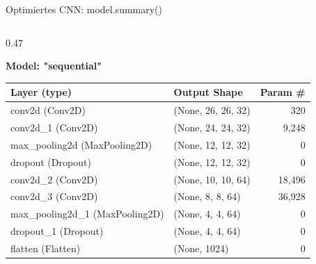 \begin{frame}{Optimiertes CNN: model.summary()}
\begin{columns}
\begin{column}{0.47\linewidth}
{\ttfamily\tiny
{}
\noindent\textbf{Model: "sequential"}
\setlength{\arrayrulewidth}{0.5pt}
\renewcommand{\arraystretch}{1.3}
\begin{tabular}{|l|l|r|}
\hline
\textbf{Layer (type)} & \textbf{Output Shape} & \textbf{Param \#}\\
\hline
conv2d (\textcolor{jupytertype}{Conv2D}) & (\textcolor{jupytertype}{None}, \textcolor{jupyternum}{26}, \textcolor{jupyternum}{26}, \textcolor{jupyternum}{32}) & \textcolor{jupyternum}{320}\\
\hline
conv2d\_1 (\textcolor{jupytertype}{Conv2D}) & (\textcolor{jupytertype}{None}, \textcolor{jupyternum}{24}, \textcolor{jupyternum}{24}, \textcolor{jupyternum}{32}) & \textcolor{jupyternum}{9,248}\\
\hline
max\_pooling2d (\textcolor{jupytertype}{MaxPooling2D}) & (\textcolor{jupytertype}{None}, \textcolor{jupyternum}{12}, \textcolor{jupyternum}{12}, \textcolor{jupyternum}{32}) & \textcolor{jupyternum}{0}\\
\hline
dropout (\textcolor{jupytertype}{Dropout}) & (\textcolor{jupytertype}{None}, \textcolor{jupyternum}{12}, \textcolor{jupyternum}{12}, \textcolor{jupyternum}{32}) & \textcolor{jupyternum}{0}\\
\hline
conv2d\_2 (\textcolor{jupytertype}{Conv2D}) & (\textcolor{jupytertype}{None}, \textcolor{jupyternum}{10}, \textcolor{jupyternum}{10}, \textcolor{jupyternum}{64}) & \textcolor{jupyternum}{18,496}\\
\hline
conv2d\_3 (\textcolor{jupytertype}{Conv2D}) & (\textcolor{jupytertype}{None}, \textcolor{jupyternum}{8}, \textcolor{jupyternum}{8}, \textcolor{jupyternum}{64}) & \textcolor{jupyternum}{36,928}\\
\hline
max\_pooling2d\_1 (\textcolor{jupytertype}{MaxPooling2D}) & (\textcolor{jupytertype}{None}, \textcolor{jupyternum}{4}, \textcolor{jupyternum}{4}, \textcolor{jupyternum}{64}) & \textcolor{jupyternum}{0}\\
\hline
dropout\_1 (\textcolor{jupytertype}{Dropout}) & (\textcolor{jupytertype}{None}, \textcolor{jupyternum}{4}, \textcolor{jupyternum}{4}, \textcolor{jupyternum}{64}) & \textcolor{jupyternum}{0}\\
\hline
flatten (\textcolor{jupytertype}{Flatten}) & (\textcolor{jupytertype}{None}, \textcolor{jupyternum}{1024}) & \textcolor{jupyternum}{0}\\

\end{tabular}}
\end{column}
\end{columns}
\end{frame}
